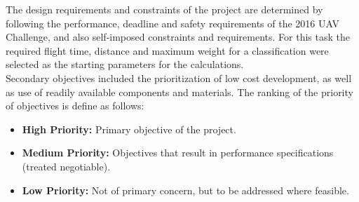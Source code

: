 The design requirements and constraints of the project are determined by following the performance, deadline and safety requirements of the 2016 UAV Challenge, and also self-imposed constraints and requirements. For this task the required flight time, distance and maximum weight for a classification were selected as the starting parameters for the calculations.\\

Secondary objectives included the prioritization of low cost development, as well as use of readily available components and materials. The ranking of the priority of objectives is define as follows:

\begin{itemize}
	\item \textbf{High Priority:} Primary objective of the project.
	\item \textbf{Medium Priority:} Objectives that result in performance specifications (treated negotiable).
	\item \textbf{Low Priority:} Not of primary concern, but to be addressed where feasible.
\end{itemize}

